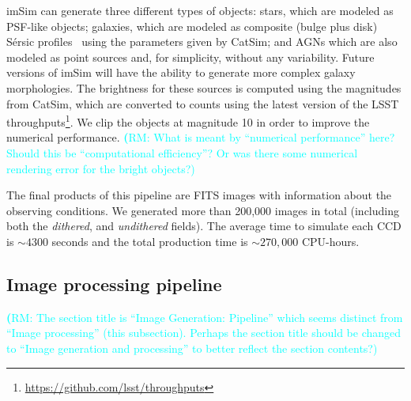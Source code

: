 \documentclass[twocolumn]{aastex62}
\newcommand{\rachel}[1]{{\textcolor{cyan}{{\textbf (RM: #1)}}}}
\begin{document}
imSim can generate three different types of objects: stars, which are modeled as PSF-like objects; galaxies, which are modeled as composite (bulge plus disk) S\'{e}rsic profiles~\citep{1963BAAA....6...41S} using
the parameters given by CatSim; and AGNs which are also modeled as point sources and, for simplicity, without any variability. Future versions of imSim will have the ability to generate more complex galaxy morphologies. The brightness for these sources is computed using the magnitudes from CatSim, which are converted to counts using the latest version of the LSST throughputs\footnote{\url{https://github.com/lsst/throughputs}}. We clip the objects at magnitude 10 in order to improve the numerical performance. \rachel{What is meant by ``numerical performance'' here?  Should this be ``computational efficiency''?  Or was there some numerical rendering error for the bright objects?}

The final products of this pipeline are FITS images with information about the observing conditions. We generated more than 200,000 images in total (including both the \textit{dithered}, and \textit{undithered} fields). The average time to simulate each CCD is $\sim 4300$ seconds and the total production time is $\sim 270,000$ CPU-hours.



\subsection{Image processing pipeline}
\label{sec:image_processing_pipeline}

\rachel{The section title is ``Image Generation: Pipeline'' which seems distinct from ``Image processing'' (this subsection).  Perhaps the section title should be changed to ``Image generation and processing'' to better reflect the section contents?}
\end{document}
